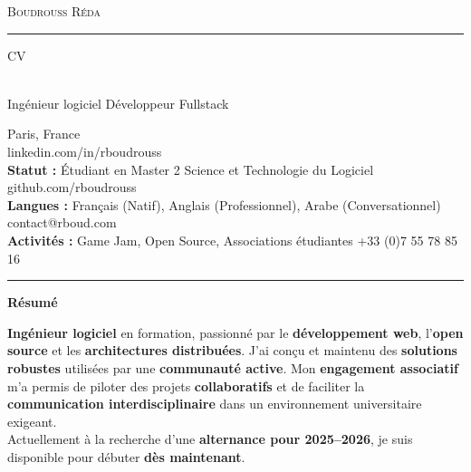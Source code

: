 \documentclass[10pt,A4]{article}
\newcommand{\cvsection}[1]
{
	\begin{center}
		\large\textcolor{sectcol}{\textbf{#1}}
	\end{center}
}
\newcommand{\metasection}[2]
{
\footnotesize{#2} \hspace*{\fill} \footnotesize{#1}\\[1pt]
}
\begin{document}
\pagestyle{fancy}	









\vspace{-8pt}
\begin{center}
    {\HUGE \textsc{Boudrouss Réda} \textcolor{sectcol}{\rule[-1mm]{1mm}{0.9cm}} \textsc{CV}}\\[2pt]
    {\small Ingénieur logiciel \textbullet{} Développeur Fullstack}
\end{center}

\vspace{6pt}

\metasection{Paris, France}{}
\metasection{linkedin.com/in/rboudrouss}{}
\metasection{github.com/rboudrouss}{\textbf{Statut :} Étudiant en Master 2 Science et Technologie du Logiciel}
\metasection{contact@rboud.com}{\textbf{Langues :} Français (Natif), Anglais (Professionnel), Arabe (Conversationnel)}
\metasection{+33 (0)7 55 78 85 16}{\textbf{Activités :} Game Jam, Open Source, Associations étudiantes}

\vspace{-15pt}
\textcolor{softcol}{\hrule}

\normalsize

\cvsection{Résumé}
\textbf{Ingénieur logiciel} en formation, passionné par le \textbf{développement web}, l'\textbf{open source} et les \textbf{architectures distribuées}. J'ai conçu et maintenu des \textbf{solutions robustes} utilisées par une \textbf{communauté active}. Mon \textbf{engagement associatif} m'a permis de piloter des projets \textbf{collaboratifs} et de faciliter la \textbf{communication interdisciplinaire} dans un environnement universitaire exigeant.\\
Actuellement à la recherche d'une \textbf{alternance pour 2025--2026}, je suis disponible pour débuter \textbf{dès maintenant}.
\end{document}
